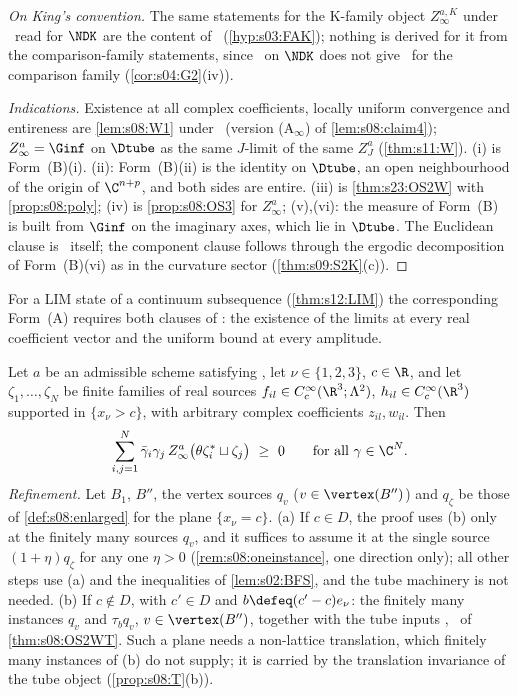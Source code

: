 \begin{theorem}
\emph{On King's convention.} The same statements for the K-family object $Z^{a,K}_\infty$ under \Wtwo\ read for $\NDK$ are the content of \FAK\ (\cref{hyp:s03:FAK}); nothing is derived for it from the comparison-family statements, since \Wtwo\ on $\NDK$ does not give \Wtwo\ for the comparison family (\cref{cor:s04:G2}(iv)).
\end{theorem}

\begin{proof}[Indications]
Existence at all complex coefficients, locally uniform convergence and entireness are \cref{lem:s08:W1} under \Wtwo\ (version (A$_\infty$) of \cref{lem:s08:claim4}); $Z^a_\infty=\Ginf$ on $\Dtube$ as the same $J$-limit of the same $Z^a_J$ (\cref{thm:s11:W}). (i) is Form~(B)(i). (ii): Form~(B)(ii) is the identity on $\Dtube$, an open neighbourhood of the origin of $\C^{n+p}$, and both sides are entire. (iii) is \cref{thm:s23:OS2W} with \cref{prop:s08:poly}; (iv) is \cref{prop:s08:OS3} for $Z^a_\infty$; (v),(vi): the measure of Form~(B) is built from $\Ginf$ on the imaginary axes, which lie in $\Dtube$. The Euclidean clause is \RW\ itself; the component clause follows through the ergodic decomposition of Form~(B)(vi) as in the curvature sector (\cref{thm:s09:S2K}(c)).
\end{proof}

For a LIM state of a continuum subsequence (\cref{thm:s12:LIM}) the corresponding Form~(A) requires both clauses of \Wtwo: the existence of the limits at every real coefficient vector and the uniform bound at every amplitude.

\begin{theorem}\label{thm:s23:OS2W}
Let $a$ be an admissible scheme satisfying \Wtwo, let $\nu\in\{1,2,3\}$, $c\in\R$, and let $\zeta_1,\dots,\zeta_N$ be finite families of real sources $f_{il}\in C^\infty_c(\R^3;\Lambda^2)$, $h_{il}\in C^\infty_c(\R^3)$ supported in $\{x_\nu>c\}$, with arbitrary complex coefficients $z_{il},w_{il}$. Then
\[
\sum_{i,j=1}^N\bar\gamma_i\gamma_j\,Z^a_\infty\big(\theta\zeta_i^*\sqcup\zeta_j\big)\ \ge\ 0\qquad\text{for all }\gamma\in\C^N .
\]
\emph{Refinement.} Let $B_1$, $B''$, the vertex sources $q_v$ ($v\in\vertex(B'')$) and $q_\zeta$ be those of \cref{def:s08:enlarged} for the plane $\{x_\nu=c\}$. (a) If $c\in D$, the proof uses \Wtwo(b) only at the finitely many sources $q_v$, and it suffices to assume it at the single source $(1+\eta)q_\zeta$ for any one $\eta>0$ (\cref{rem:s08:oneinstance}, one direction only); all other steps use \Wtwo(a) and the inequalities of \cref{lem:s02:BFS}, and the tube machinery is not needed. (b) If $c\notin D$, with $c'\in D$ and $b\defeq(c'-c)e_\nu$: the finitely many instances $q_v$ and $\tau_bq_v$, $v\in\vertex(B'')$, together with the tube inputs \Itwo, \Ithree\ of \cref{thm:s08:OS2WT}. Such a plane needs a non-lattice translation, which finitely many instances of \Wtwo(b) do not supply; it is carried by the translation invariance of the tube object (\cref{prop:s08:T}(b)).
\end{theorem}

